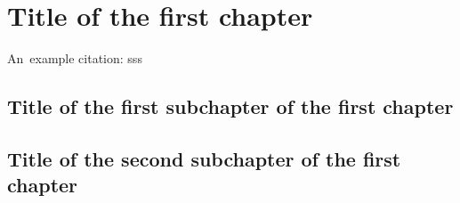 \chapter{Title of the first chapter}

An~example citation: \cite{Andel07}
sss
\section{Title of the first subchapter of the first chapter}

\section{Title of the second subchapter of the first chapter}
